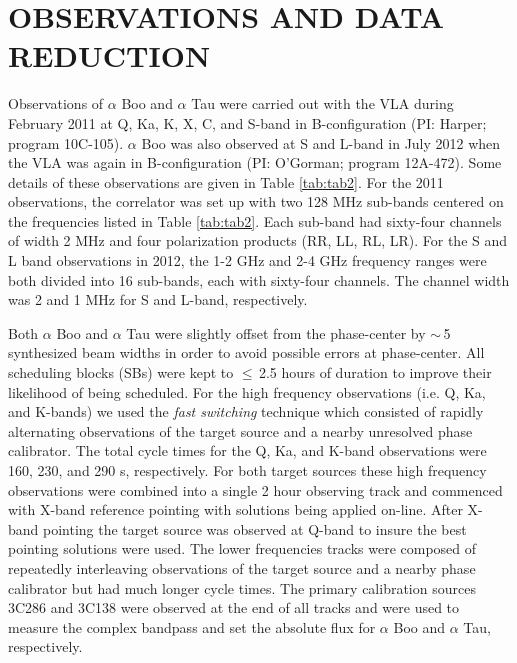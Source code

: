 \documentclass[iop]{emulateapj}
\begin{document}
\section{OBSERVATIONS AND DATA REDUCTION}

Observations of $\alpha$ Boo and $\alpha$ Tau were carried out with the VLA during February 2011 at Q, Ka, K, X, C, and S-band in B-configuration (PI: Harper; program 10C-105). $\alpha$ Boo was also observed at S and L-band in July 2012 when the VLA was again in B-configuration (PI: O'Gorman; program 12A-472). Some details of these observations are given in Table \ref{tab:tab2}. For the 2011 observations, the correlator was set up with two 128 MHz sub-bands centered on the frequencies listed in Table \ref{tab:tab2}. Each sub-band had sixty-four channels of width 2 MHz and four polarization products (RR, LL, RL, LR). For the S and L band observations in 2012, the 1-2 GHz and 2-4 GHz frequency ranges were both divided into 16 sub-bands, each with sixty-four channels. The channel width was 2 and 1 MHz for S and L-band, respectively.

Both $\alpha$ Boo and $\alpha$ Tau were slightly offset from the phase-center by $\sim$\,5 synthesized beam widths in order to avoid possible errors at phase-center. All scheduling blocks (SBs) were kept to $\le$\,2.5 hours of duration to improve their likelihood of being scheduled. For the high frequency observations (i.e. Q, Ka, and K-bands) we used the \textit{fast switching} technique which consisted of rapidly alternating observations of the target source and a nearby unresolved phase calibrator. The total cycle times for the Q, Ka, and K-band observations were 160, 230, and 290 s, respectively. For both target sources these high frequency observations were combined into a single 2 hour observing track and commenced with X-band reference pointing with solutions being applied on-line. After X-band pointing the target source was observed at Q-band to insure the best pointing solutions were used. The lower frequencies tracks were composed of repeatedly interleaving observations of the target source and a nearby phase calibrator but had much longer cycle times. The primary calibration sources 3C286 and 3C138 were observed at the end of all tracks and were used to measure the complex bandpass and set the absolute flux for $\alpha$ Boo and $\alpha$ Tau, respectively.  
\end{document}
